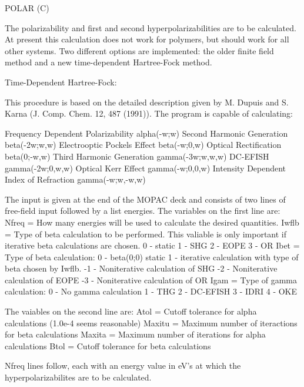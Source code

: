 

                                     POLAR (C)
     
          The polarizability and first and second hyperpolarizabilities are to
     be  calculated.   At present this calculation does not work for polymers,
     but should work for all other systems.  Two different options are
     implemented: the older finite field method and a new time-dependent
     Hartree-Fock method.
     
     Time-Dependent Hartree-Fock:

          This procedure is based on the detailed description given by
     M. Dupuis and S. Karna (J. Comp. Chem. 12, 487 (1991)).  The
     program is capable of calculating:
 
        Frequency Dependent Polarizability         alpha(-w;w)
        Second Harmonic Generation                 beta(-2w;w,w)
        Electrooptic Pockels Effect                beta(-w;0,w)
        Optical Rectification                      beta(0;-w,w)
        Third Harmonic Generation                  gamma(-3w;w,w,w)
        DC-EFISH                                   gamma(-2w;0,w,w)
        Optical Kerr Effect                        gamma(-w;0,0,w)
        Intensity Dependent Index of Refraction    gamma(-w;w,-w,w)

          The input is given at the end of the MOPAC deck and 
     consists of two lines of free-field input followed by a list
     energies.  
          The variables on the first line are:
             Nfreq  =  How many energies will be used to calculate 
                       the desired quantities.
             Iwflb  =  Type of beta calculation to be performed.
                       This valiable is only important if iterative
                       beta calculations are chosen.
                        0 - static
                        1 - SHG
                        2 - EOPE
                        3 - OR 
             Ibet   =  Type of beta calculation:
                        0 - beta(0;0)  static
                        1 - iterative calculation with type of
                            beta chosen by Iwflb.
                       -1 - Noniterative calculation of SHG
                       -2 - Noniterative calculation of EOPE
                       -3 - Noniterative calculation of OR
             Igam   =  Type of gamma calculation:
                        0 - No gamma calculation
                        1 - THG
                        2 - DC-EFISH
                        3 - IDRI
                        4 - OKE

          The vaiables on the second line are:
             Atol   =  Cutoff tolerance for alpha calculations
                       (1.0e-4 seems reasonable)
             Maxitu =  Maximum number of iteractions for beta
                       calculations
             Maxita =  Maximum number of iterations for alpha
                       calculations
             Btol   =  Cutoff tolerance for beta calculations

          Nfreq lines follow, each with an energy value in eV's at
     which the hyperpolarizabilites are to be calculated.




